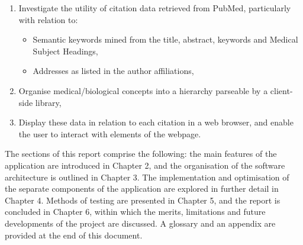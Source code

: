 \documentclass[Report.tex]{subfiles}
\begin{document}
\begin{enumerate}
\item Investigate the utility of citation data retrieved from PubMed, particularly with relation to:
	\begin{itemize}
	\item Semantic keywords mined from the title, abstract, keywords and Medical Subject Headings,
	\item Addresses as listed in the author affiliations,
	\end{itemize}
\item Organise medical/biological concepts into a hierarchy parseable by a client-side library,
\item Display these data in relation to each citation in a web browser, and enable the user to interact with elements of the webpage.
\end{enumerate}

\noindent The sections of this report comprise the following: the main features of the application are introduced in Chapter 2, and the organisation of the software architecture is outlined in Chapter 3. The implementation and optimisation of the separate components of the application are explored in further detail in Chapter 4. Methods of testing are presented in Chapter 5, and the report is concluded in Chapter 6, within which the merits, limitations and future developments of the project are discussed. A glossary and an appendix are provided at the end of this document.
\end{document}
